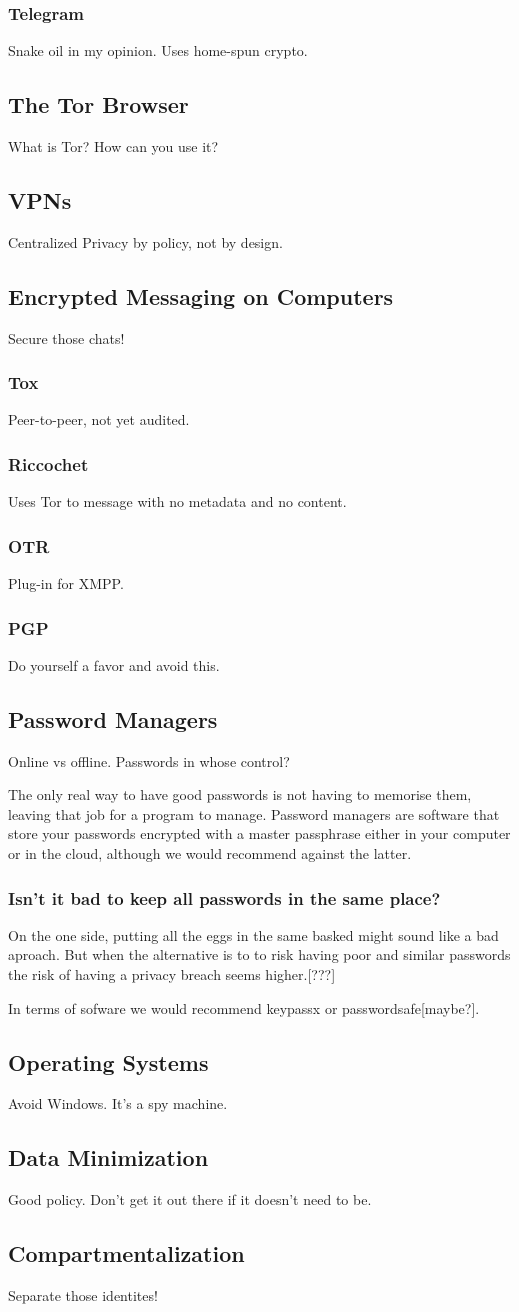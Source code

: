 \subsubsection{Telegram}
Snake oil in my opinion. Uses home-spun crypto.
\subsection{The Tor Browser}
What is Tor? How can you use it?
\subsection{VPNs}
Centralized Privacy by policy, not by design.
\subsection{Encrypted Messaging on Computers}
Secure those chats!
\subsubsection{Tox}
Peer-to-peer, not yet audited.
\subsubsection{Riccochet}
Uses Tor to message with no metadata and no content.
\subsubsection{OTR}
Plug-in for XMPP.
\subsubsection{PGP}
Do yourself a favor and avoid this.
\subsection{Password Managers}
Online vs offline. Passwords in whose control?

The only real way to have good passwords is not having to memorise them, leaving
that job for a program to manage. Password managers are software that store your
passwords encrypted with a master passphrase either in your computer or in the
cloud, although we would recommend against the latter.
\subsubsection{Isn't it bad to keep all passwords in the same place?}
On the one side, putting all the eggs in the same basked might sound like a bad
aproach. But when the alternative is to to risk having poor and similar passwords
the risk of having a privacy breach seems higher.[???]

In terms of sofware we would recommend keypassx or passwordsafe[maybe?].
\subsection{Operating Systems}
Avoid Windows. It's a spy machine.
\subsection{Data Minimization}
Good policy. Don't get it out there if it doesn't need to be.
\subsection{Compartmentalization}
Separate those identites!
